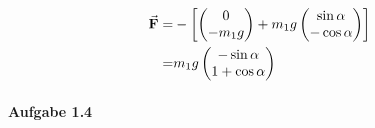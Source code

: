 \begin{align*}
	\va F=&-\left[ \begin{pmatrix} 0 \\ -m_1g \end{pmatrix} +m_1g\begin{pmatrix} \sin\alpha \\-\cos\alpha  \end{pmatrix}  \right]\\
	=& m_1g\begin{pmatrix} -\sin\alpha \\ 1+\cos\alpha \end{pmatrix} 
\end{align*}
\paragraph{Aufgabe 1.4}
